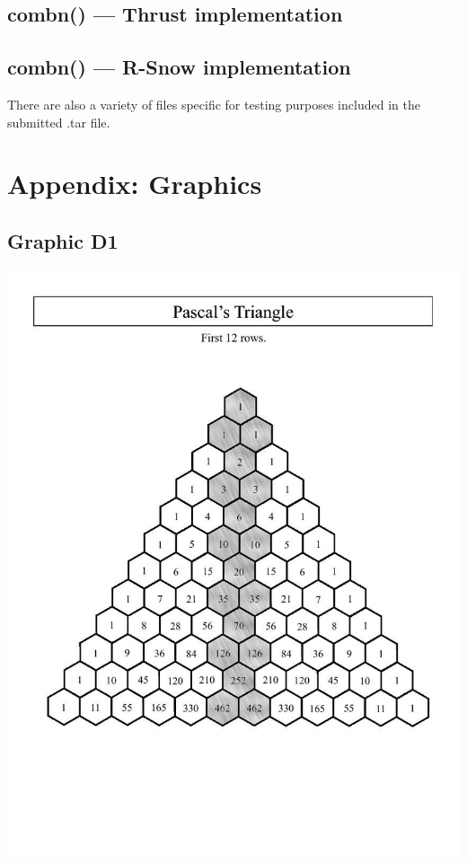 \documentclass[titlepage, 11pt]{article}
\begin{document}
\subsection{combn() --- Thrust implementation}


\subsection{combn() --- R-Snow implementation}



There are also a variety of files specific for testing purposes included in the submitted .tar file.

\section{Appendix: Graphics}
\subsection{Graphic D1}
\begin{center}
\includegraphics[scale = 0.4]{images/pascals-triangle-vert.jpg} \\
\end{center}
\end{document}
